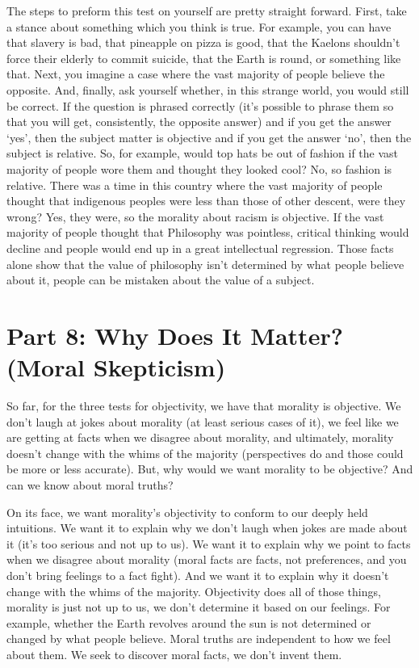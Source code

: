The steps to preform this test on yourself are pretty straight forward. First, take a stance about something which you think is true. For example, you can have that slavery is bad, that pineapple on pizza is good, that the Kaelons shouldn't force their elderly to commit suicide, that the Earth is round, or something like that. Next, you imagine a case where the vast majority of people believe the opposite. And, finally, ask yourself whether, in this strange world, you would still be correct.  If the question is phrased correctly (it's possible to phrase them so that you will get, consistently, the opposite answer) and if you get the answer `yes', then the subject matter is objective and if you get the answer `no', then the subject is relative. So, for example, would top hats be out of fashion if the vast majority of people wore them and thought they looked cool? No, so fashion is relative. There was a time in this country where the vast majority of people thought that indigenous peoples were less than those of other descent, were they wrong? Yes, they were, so the morality about racism is objective. If the vast majority of people thought that Philosophy was pointless, critical thinking would decline and people would end up in a great intellectual regression. Those facts alone show that the value of philosophy isn't determined by what people believe about it, people can be mistaken about the value of a subject. 

\chapter{Part 8: Why Does It Matter? (Moral Skepticism)}

So far, for the three tests for objectivity, we have that morality is objective. We don't laugh at jokes about morality (at least serious cases of it), we feel like we are getting at facts when we disagree about morality, and ultimately, morality doesn't change with the whims of the majority (perspectives do and those could be more or less accurate). But, why would we want morality to be objective? And can we know about moral truths?

On its face, we want morality's objectivity to conform to our deeply held intuitions. We want it to explain why we don't laugh when jokes are made about it (it's too serious and not up to us). We want it to explain why we point to facts when we disagree about morality (moral facts are facts, not preferences, and you don't bring feelings to a fact fight). And we want it to explain why it doesn't change with the whims of the majority. Objectivity does all of those things, morality is just not up to us, we don't determine it based on our feelings. For example, whether the Earth revolves around the sun is not determined or changed by what people believe. Moral truths are independent to how we feel about them. We seek to discover moral facts, we don't invent them.

